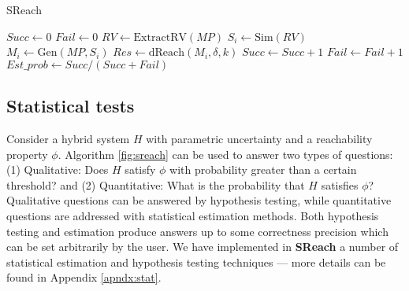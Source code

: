 \begin{algorithm}
  \centering
  \caption{SReach}
  \label{fig:sreach}
  \begin{algorithmic}[1]
        \State $Succ \gets 0$
        \State $Fail \gets 0$
        \State $RV \gets \mathrm{ExtractRV}(MP)$
        \Repeat
        	   \State $S_i \gets \mathrm{Sim}(RV)$
            \State $M_i \gets \mathrm{Gen}(MP, S_i)$
            \State $Res \gets \mathrm{dReach}(M_i, \delta, k)$
		\State $Succ \gets Succ + 1$
	  \Else
		\State $Fail \gets Fail + 1$
	  \EndIf
        \State $Est\_prob \gets Succ / (Succ + Fail)$
   \EndProcedure
  \end{algorithmic}
\end{algorithm}

\subsection{Statistical tests}
Consider a hybrid system $H$ with parametric uncertainty  and a reachability property $\phi$. Algorithm \ref{fig:sreach} can be used to answer two types of questions: (1) Qualitative: Does $H$ satisfy $\phi$ with probability
greater than a certain threshold? and (2) Quantitative: What is the probability that $H$ satisfies $\phi$?
Qualitative questions can be answered by hypothesis testing, while quantitative questions are addressed with
statistical estimation methods. Both hypothesis testing and estimation produce answers up to some correctness 
precision which can be set arbitrarily by the user.
We have implemented in {\bf SReach} a number of statistical estimation and hypothesis testing techniques ---
more details can be found in Appendix \ref{apndx:stat}.
